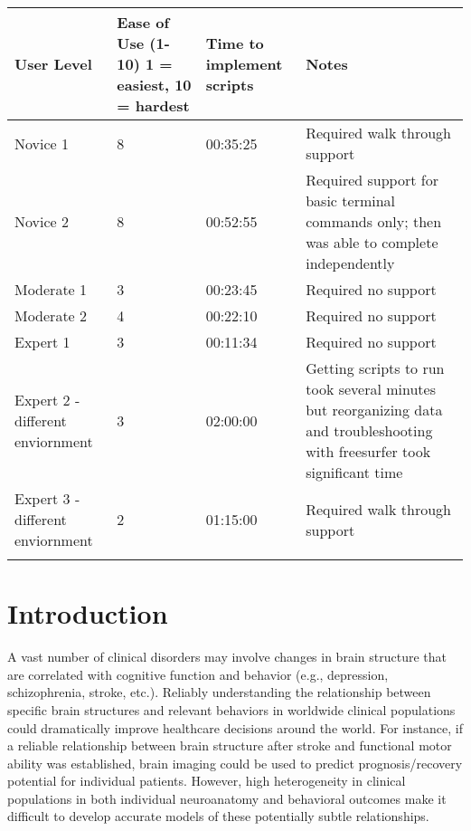 \documentclass[twocolumn]{bmcart}%
\begin{document}
\begin{table*}
\begin{tabular*}{\textwidth}{p{3cm}p{2cm}p{4cm}p{6cm}}
  User Level  & Ease of Use (1-10) 1 = easiest, 10 = hardest & Time to implement scripts & Notes \\
    \hline\noalign{\smallskip}
  Novice 1     &     8     &     00:35:25     &     Required walk through support   \\
  Novice 2     &     8     &     00:52:55     &     Required support for basic terminal commands only; then was able to complete independently   \\
  Moderate 1     &     3     &     00:23:45     &     Required no support   \\
  Moderate 2     &     4     &     00:22:10     &     Required no support   \\
  Expert 1     &     3      &     00:11:34     &     Required no support   \\
  Expert 2 - different enviornment     &     3     &     02:00:00     &     Getting scripts to run took several minutes but reorganizing data and troubleshooting with freesurfer took significant time   \\ 
  Expert 3 - different enviornment     &     2     &     01:15:00     &     Required walk through support   \\ 
  \noalign{\smallskip}\hline
\end{tabular*}
\end{table*}

\section{Introduction}\label{introduction}

A vast number of clinical disorders may involve changes in brain
structure that are correlated with cognitive function and behavior
(e.g., depression, schizophrenia, stroke, etc.). Reliably understanding
the relationship between specific brain structures and relevant
behaviors in worldwide clinical populations could dramatically improve
healthcare decisions around the world. For instance, if a reliable
relationship between brain structure after stroke and functional motor
ability was established, brain imaging could be used to predict
prognosis/recovery potential for individual patients. However, high
heterogeneity in clinical populations in both individual neuroanatomy
and behavioral outcomes make it difficult to develop accurate models of
these potentially subtle relationships.
\end{document}
